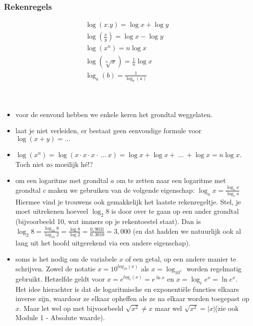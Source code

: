 \subsubsection{Rekenregels}

\begin{ftrekenregel}
\begin{eqnarray}
\log\left(x.y\right)=\log x+\log y\\
\log\left(\frac{x}{y}\right)=\log x-\log y\\
\log\left(x^{n}\right)=n\log x\\
\log\left(\sqrt[n]{x}\right)=\frac{1}{n}\log x\\
\log_{a}\left(b\right)=\frac{1}{\log_{b}\left(a\right)}\\
\end{eqnarray}
\end{ftrekenregel}


\begin{opmerking}
	\ \\
\begin{itemize}
\item voor de eenvoud hebben we enkele keren het grondtal weggelaten. 
\item laat je niet verleiden, er bestaat geen eenvoudige formule voor $\log\left(x+y\right)=\ldots$
\item $\log\left(x^{n}\right)=\log\left(x\cdot x\cdot x\cdot \:\ldots\:x\right)=\log x+\log x+\:\ldots\:+\log x=n\log x$.
Toch niet zo moeilijk h\'e!?
\item om een logaritme met grondtal $a$ om te zetten naar een logaritme met
grondtal $c$ maken we gebruiken van de volgende eigenschap: $\log_{a}x=\frac{\log_{c}x}{\log_{c}a}$
Hiermee vind je trouwens ook gemakkelijk het laatste rekenregeltje.
Stel, je moet uitrekenen hoeveel $\log_{2}8$ is door
over te gaan op een ander grondtal (bijvoorbeeld 10, wat immers op
je rekentoestel staat). Dan is $\log_{2}8=\frac{\log_{10}8}{\log_{10}2}=\frac{\log8}{\log2}=\frac{0,9031}{0,3010}=3,000$
(en dat hadden we natuurlijk ook al lang uit het hoofd uitgerekend
via een andere eigenschap).
\item soms is het nodig om de variabele $x$ of een getal, op een andere
manier te schrijven. Zowel de notatie $x=10^{log_{10}(x)}$
als $x=\log_{10^x}$ worden regelmatig gebruikt.
Hetzelfde geldt voor $x=e^{log_{e}(x)}=e^{\ln x}$
en $x=\log_{e}e^{x}=\ln e^{x}$. Het idee hierachter
is dat de logaritmische en exponenti\"ele functies elkaars inverse zijn,
waardoor ze elkaar opheffen als ze na elkaar worden toegepast op $x$.
Maar let wel op met bijvoorbeeld $\sqrt{x^{2}}\neq x$
maar wel $\sqrt{x^{2}}=\left|x\right|$(zie ook Module
1 - Absolute waarde).
\end{itemize}

\end{opmerking}

